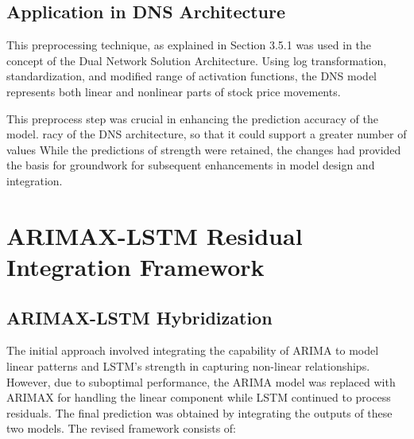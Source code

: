 \subsection{Application in DNS Architecture}
This preprocessing technique, as explained in Section 3.5.1 was used in the concept of the Dual Network Solution Architecture. Using log transformation, standardization, and modified range of activation functions,
the DNS model represents both linear and nonlinear parts of
stock price movements.

This preprocess step was crucial in enhancing the prediction accuracy of the model.
racy of the DNS architecture, so that it could support a greater number of values
While the predictions of strength were retained, the changes had provided the basis for
groundwork for subsequent enhancements in model design and integration.



\section{ARIMAX-LSTM Residual Integration Framework}
\subsection{ARIMAX-LSTM Hybridization}

The initial approach involved integrating the capability of ARIMA to model linear patterns and LSTM's strength in capturing non-linear relationships. However, due to suboptimal performance, the ARIMA model was replaced with ARIMAX for handling the linear component while LSTM continued to process residuals. The final prediction was obtained by integrating the outputs of these two models. The revised framework consists of:

